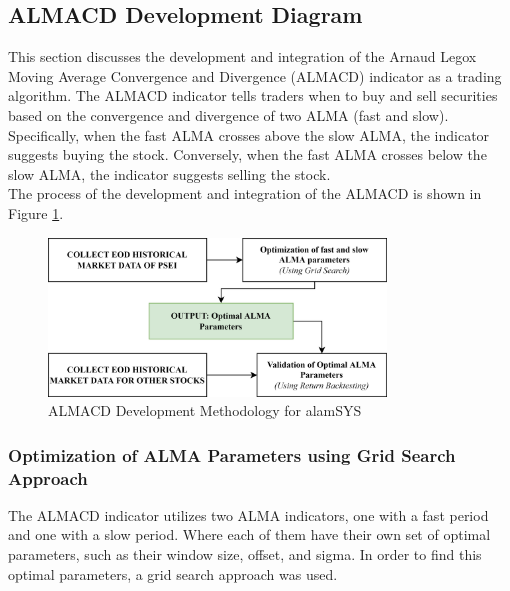 \subsection{ALMACD Development Diagram}
\label{subsec:almacd_diagram}
This section discusses the development and integration of the
Arnaud Legox Moving Average Convergence and Divergence (ALMACD)
indicator as a trading algorithm. The ALMACD indicator tells
traders when to buy and sell securities based on the convergence
and divergence of two ALMA (fast and slow). Specifically, when
the fast ALMA crosses above the slow ALMA, the indicator suggests
buying the stock. Conversely, when the fast ALMA crosses below
the slow ALMA, the indicator suggests selling the stock.
\hfill \\

The process of the development and integration of the ALMACD
is shown in Figure \ref{fig:almacd_diagram}.

\begin{figure}[ht]
    \centering
    \includegraphics[width=0.80\textwidth]{./assets/Chapter_3/alamcd.png}
    \caption{ALMACD Development Methodology for alamSYS}
    \label{fig:almacd_diagram}
\end{figure}
\FloatBarrier

\subsubsection{Optimization of ALMA Parameters using Grid Search Approach}
\label{subsubsec:almacd_gridsearch}
The ALMACD indicator utilizes two ALMA indicators, one with a fast
period and one with a slow period. Where each of them have their own
set of optimal parameters, such as their window size, offset, and sigma.
In order to find this optimal parameters, a grid search approach was
used.
\hfill \\

